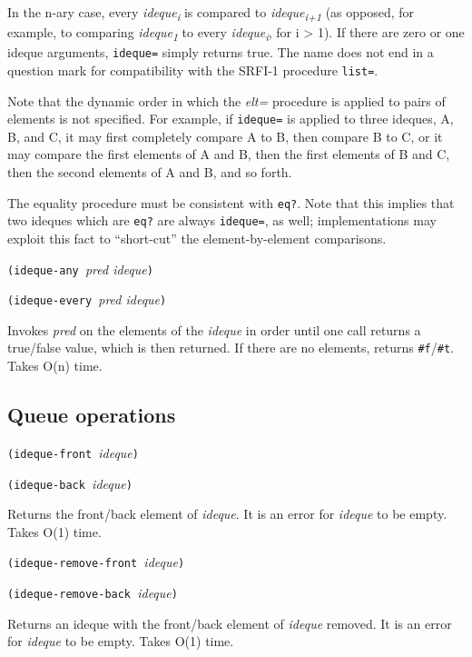In the n-ary case, every \emph{ideque\textsubscript{i}} is compared to
\emph{ideque\textsubscript{i+1}} (as opposed, for example, to comparing
\emph{ideque\textsubscript{1}} to every \emph{ideque\textsubscript{i}},
for i \textgreater{} 1). If there are zero or one ideque arguments,
\texttt{ideque=} simply returns true. The name does not end in a
question mark for compatibility with the SRFI-1 procedure
\texttt{list=}.

Note that the dynamic order in which the \emph{elt=} procedure is
applied to pairs of elements is not specified. For example, if
\texttt{ideque=} is applied to three ideques, A, B, and C, it may first
completely compare A to B, then compare B to C, or it may compare the
first elements of A and B, then the first elements of B and C, then the
second elements of A and B, and so forth.

The equality procedure must be consistent with \texttt{eq?}. Note that
this implies that two ideques which are \texttt{eq?} are always
\texttt{ideque=}, as well; implementations may exploit this fact to
``short-cut'' the element-by-element comparisons.

\texttt{(ideque-any\ }\emph{pred ideque}\texttt{)}

\texttt{(ideque-every\ }\emph{pred ideque}\texttt{)}

Invokes \emph{pred} on the elements of the \emph{ideque} in order until
one call returns a true/false value, which is then returned. If there
are no elements, returns \texttt{\#f}/\texttt{\#t}. Takes O(n) time.

\hypertarget{Queueoperations}{\subsection{Queue
operations}\label{Queueoperations}}

\texttt{(ideque-front\ }\emph{ideque}\texttt{)}

\texttt{(ideque-back\ }\emph{ideque}\texttt{)}

Returns the front/back element of \emph{ideque}. It is an error for
\emph{ideque} to be empty. Takes O(1) time.

\texttt{(ideque-remove-front\ }\emph{ideque}\texttt{)}

\texttt{(ideque-remove-back\ }\emph{ideque}\texttt{)}

Returns an ideque with the front/back element of \emph{ideque} removed.
It is an error for \emph{ideque} to be empty. Takes O(1) time.


